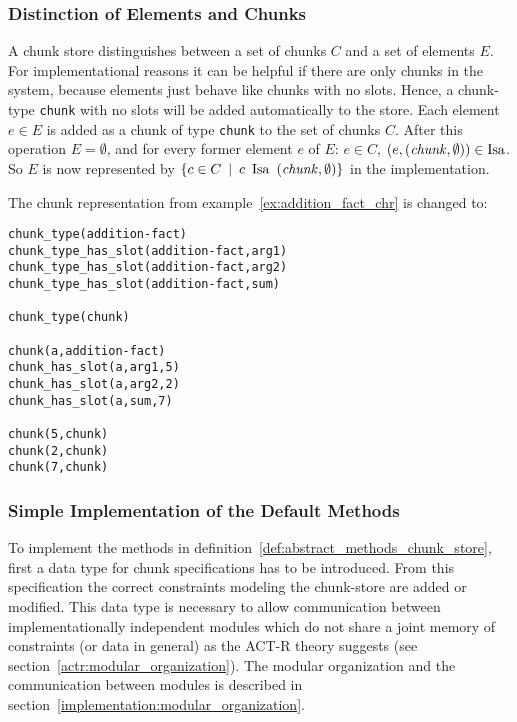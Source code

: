 \subsubsection{Distinction of Elements and Chunks}
\label{distinction_elements_chunks}

A chunk store distinguishes between a set of chunks $C$ and a set of elements $E$. For implementational reasons it can be helpful if there are only chunks in the system, because elements just behave like chunks with no slots. Hence, a chunk-type \lstinline|chunk| with no slots will be added automatically to the store. Each element $e \in E$ is added as a chunk of type \lstinline|chunk| to the set of chunks $C$. After this operation $E = \emptyset$, and for every former element $e$ of $E$: $e \in C$, $(e,(\mathord{\mathit{chunk}},\emptyset)) \in \mathord{\mathrm{Isa}}$. So $E$ is now represented by $\{ c \in C \enspace | \enspace c \enspace \mathord{\mathrm{Isa}} \enspace (\mathord{\mathit{chunk}},\emptyset) \}$ in the implementation.

\begin{example}
The chunk representation from example~\ref{ex:addition_fact_chr} is changed to:

\begin{lstlisting}
chunk_type(addition-fact)
chunk_type_has_slot(addition-fact,arg1)
chunk_type_has_slot(addition-fact,arg2)
chunk_type_has_slot(addition-fact,sum)

chunk_type(chunk)

chunk(a,addition-fact)
chunk_has_slot(a,arg1,5)
chunk_has_slot(a,arg2,2)
chunk_has_slot(a,sum,7)

chunk(5,chunk)
chunk(2,chunk)
chunk(7,chunk)
\end{lstlisting}
\end{example}


\subsubsection{Simple Implementation of the Default Methods}
\label{chunk_specification}

To implement the methods in definition~\ref{def:abstract_methods_chunk_store}, first a data type for chunk specifications has to be introduced. From this specification the correct constraints modeling the chunk-store are added or modified. This data type is necessary to allow communication between implementationally independent modules which do not share a joint memory of constraints (or data in general) as the ACT-R theory suggests (see section~\ref{actr:modular_organization}). The modular organization and the communication between modules is described in section~\ref{implementation:modular_organization}. 

